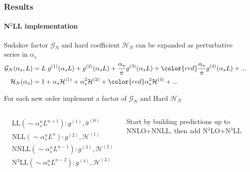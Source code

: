 \documentclass[aspectratio=43]{beamer}
\begin{document}
\begin{frame}
	
	\frametitle{Results}
	\framesubtitle{N$^{3}$LL implementation}
	
	\footnotesize
	
	Sudakov factor $\mathcal{G}_{N}$ and hard coefficient $\mathcal{H}_{N}$ can be expanded as perturbative series in $\alpha_{s}$
	\begin{align}
	\mathcal{G}_{N}(\alpha_{s}, L) &= L\;g^{(1)}(\alpha_{s}L) + g^{(2)}(\alpha_{s}L) + \frac{\alpha_{s}}{\pi}g^{(3)}(\alpha_{s}L) + {\color{red}\frac{\alpha_{s}}{\pi}g^{(4)}(\alpha_{s}L)} + ... \nonumber \\
	\mathcal{H}_{N}(\alpha_{s}) &= 1 + \alpha_{s}\mathcal{H}^{(1)} + \alpha_{s}^{2}\mathcal{H}^{(2)} + {\color{red}\alpha_{s}^{2}\mathcal{H}^{(3)}} + ...  \nonumber
	\end{align}
	
	For each new order implement a factor of $\mathcal{G}_{N}$ and Hard $\mathcal{H}_{N}$
	
	\begin{columns}
		
		
		\begin{align}
			&\textrm{LL} (\sim \alpha_{s}^{n}L^{n+1}): g^{(1)}, \hat{\sigma}^{(0)} \nonumber \\
			&\textrm{NLL} (\sim \alpha_{s}^{n}L^{n}): g^{(2)}, \mathcal{H}^{(1)} \nonumber \\
			&\textrm{NNLL} (\sim \alpha_{s}^{n}L^{n-1}): g^{(3)}, \mathcal{H}^{(2)} \nonumber \\
			&\textrm{N$^{3}$LL} (\sim \alpha_{s}^{n}L^{n-2}): g^{(4)}, \mathcal{H}^{(3)} \nonumber
		\end{align}
		
		
		Start by building predictions up to NNLO+NNLL, then add {\color{red}N$^{3}$LO+N$^{3}$LL}
		
	\end{columns}

\end{frame}
\end{document}
